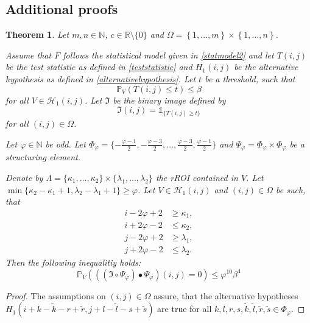 \documentclass[a4paper,12pt]{article}
\theoremstyle{plain}
\newtheorem{theorem}{Theorem}[section]
\theoremstyle{definition}
\begin{document}
\begin{appendix}
	\section{Additional proofs}
	
	\begin{theorem}
		Let $m, n \in \mathbb{N}$, $c \in \mathbb{R} \setminus \{ 0 \}$ and $\Omega = \left\{ 1, \dots, m \right\} \times \left\{ 1, \dots, n \right\}$.
		
		Assume that $F$ follows the statistical model given in \eqref{statmodel2} and let $T(i, j)$ be the test statistic as defined in \eqref{teststatistic} and $H_1(i, j)$ be the alternative hypothesis as defined in \eqref{alternativehypothesis}. Let $t$ be a threshold, such that
		\begin{equation*}
			\mathbb{P}_V\left( T(i, j) \leq t \right) \leq \beta
		\end{equation*}
		for all $V \in \mathcal{H}_1(i, j)$. Let $\mathfrak{I}$ be the binary image defined by
		\begin{equation}
			\mathfrak{I}(i, j) = \mathds{1}_{ \{ T(i, j) \geq t \} }
		\end{equation}
		for all $(i, j) \in \Omega$.
		
		Let $\varphi \in \mathbb{N}$ be odd. Let $\Phi_\varphi = \{ -\frac{\varphi - 1}{2}, -\frac{\varphi - 3}{2}, \dots, \frac{\varphi - 3}{2}, \frac{\varphi - 1}{2} \}$ and $\Psi_\varphi = \Phi_\varphi \times \Phi_\varphi$ be a structuring element.
		
		Denote by $\varLambda = \{ \kappa_1, \dots, \kappa_2 \} \times \{ \lambda_1, \dots, \lambda_2 \}$ the rROI contained in $V$. Let $\min \{ \kappa_2 - \kappa_1 + 1, \lambda_2 - \lambda_1 + 1 \} \geq \varphi$. Let $V \in \mathcal{H}_1(i, j)$ and $(i, j) \in \Omega$ be such, that
		\begin{equation}
			\begin{aligned}
				i - 2 \varphi + 2 &\geq \kappa_1, \\
				i + 2 \varphi - 2 &\leq \kappa_2, \\
				j - 2 \varphi + 2 &\geq \lambda_1, \\
				j + 2 \varphi - 2 &\leq \lambda_2.
			\end{aligned}
		\end{equation}
		Then the following inequalitiy holds:
		\begin{equation}
			\mathbb{P}_V\left( ((\mathfrak{I} \circ \Psi_\varphi) \bullet \Psi_\varphi)(i, j) = 0 \right) \leq \varphi^{10} \beta^4
		\end{equation}
	\end{theorem}
	\begin{proof}
		The assumptions on $(i, j) \in \Omega$ assure, that the alternative hypotheses $H_1(i + k - \tilde{k} - r + \tilde{r}, j + l - \tilde{l} - s + \tilde{s})$ are true for all $k, l, r, s, \tilde{k}, \tilde{l}, \tilde{r}, \tilde{s} \in \Phi_\varphi$.
		

\end{proof}
\end{appendix}
\end{document}
